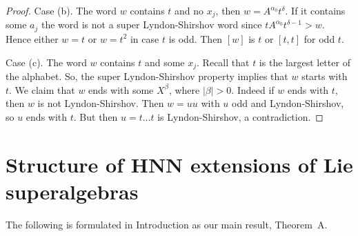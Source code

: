 \documentclass[12pt, reqno]{amsart}
\theoremstyle{remark}
\theoremstyle{definition}
\numberwithin{equation}{section}
\begin{document}
\begin{proof}
Case (b). The word  $w$ contains $t$ and no $x_j$,   then $w=A^{\alpha_0} t^{\delta}$. If it contains some $a_j$ the word is not a super Lyndon-Shirshov word  since $tA^{\alpha_0} t^{\delta-1} > w$.
Hence either $w=t$ or $w=t^2$ in case $t$ is odd. Then $[w]$ is $t$ or $[t,t]$ for odd $t$.

Case (c). The word $w$ contains $t$ and some $x_j$. Recall that $t$ is the largest letter of the alphabet.
So, the super Lyndon-Shirshov property implies that $w$ starts with $t$.
We claim that $w$  ends with some $X^\beta$, where $|\beta|>0$.
Indeed if $w$ ends with $t$, then $w$ is not Lyndon-Shirshov. Then $w = uu$ with $u$ odd and Lyndon-Shirshov, so $u$ ends with $t$. But then $u = t \ldots t$ is Lyndon-Shirshov, a contradiction.
\end{proof}


\section{Structure of HNN extensions of Lie superalgebras} 

The following is formulated in Introduction as our main result, Theorem~A.
\end{document}
